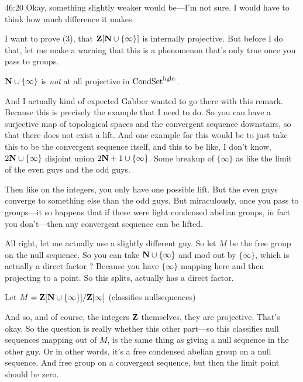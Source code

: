 \begin{unfinished}{46:20}
Okay, something slightly weaker would be---I'm not sure. I would have to think how much difference it makes.


I want to prove (3), that $\mathbf Z[\mathbf N \cup \{\infty\}]$ is internally projective. But before I do that, let me make a warning that this is a phenomenon that's only true once you pass to groups. 

\begin{remark}
$\mathbf N \cup \{\infty\}$ is \emph{not} at all projective in $\mathrm{Cond}\mathrm{Set}^{\mathrm{light}}$.


And I actually kind of expected Gabber wanted to go there with this remark. Because this is precisely the example that I need to do. So you can have a surjective map of topological spaces and the convergent sequence downstairs, so that there does not exist a lift. And one example for this would be to just take this to be the convergent sequence itself, and this to be like, I don't know, $2\mathbf N \cup \{\infty\}$ disjoint union $2\mathbf N+1 \cup \{\infty\}$. 
Some breakup of $\{\infty\}$ as like the limit of the even guys and the odd guys.

Then like on the integers, you only have one possible lift. But the even guys converge to something else than the odd guys. 
But miraculously, once you pass to groups---it so happens that if these were light condensed abelian groups, in fact you don't---then any convergent sequence can be lifted.



\end{remark}

All right, let me actually use a slightly different guy. So let $M$ be the free group on the null sequence. So you can take $\mathbf N \cup \{\infty\}$ and mod out by $\{\infty\}$, which is actually a direct factor ? Because you have $\{\infty\}$ mapping here and then projecting to a point. So this splits, actually has a direct factor.

Let $M = \mathbf Z[\mathbf N \cup \{\infty\}] / \mathbf Z[\infty] $
(classifies nullsequences)

And so, and of course, the integers $\mathbf Z$ themselves, they are projective. That's okay. So the question is really whether this other part---so this classifies null sequences mapping out of $M$, is the same thing as giving a null sequence in the other guy. Or in other words, it's a free condensed abelian group on a null sequence. And free group on a convergent sequence, but then the limit point should be zero.


\end{unfinished}
